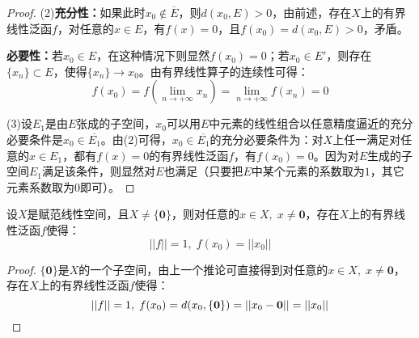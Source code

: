 \begin{proof}
	(2)\textbf{充分性：}如果此时$x_0\notin\overline{E}$，则$d(x_0,E)>0$，由前述，存在$X$上的有界线性泛函$f$，对任意的$x\in E$，有$f(x)=0$，且$f(x_0)=d(x_0,E)>0$，矛盾。\par
	\textbf{必要性：}若$x_0\in E$，在这种情况下则显然$f(x_0)=0$；若$x_0\in E'$，则存在$\{x_n\}\subset E$，使得$\{x_n\}\to x_0$。由有界线性算子的连续性可得：
	\begin{equation*}
		f(x_0)=f\left(\lim_{n\to+\infty}x_n\right)=\lim_{n\to+\infty}f(x_n)=0
	\end{equation*}\par
	(3)设$E_1$是由$E$张成的子空间，$x_0$可以用$E$中元素的线性组合以任意精度逼近的充分必要条件是$x_0\in\overline{E_1}$。由(2)可得，$x_0\in\overline{E_1}$的充分必要条件为：对$X$上任一满足对任意的$x\in E_1$，都有$f(x)=0$的有界线性泛函$f$，有$f(x_0)=0$。因为对$E$生成的子空间$E_1$满足该条件，则显然对$E$也满足（只要把$E$中某个元素的系数取为$1$，其它元素系数取为$0$即可）。
\end{proof}
\begin{corollary}
	设$X$是赋范线性空间，且$X\ne\{\mathbf{0}\}$，则对任意的$x\in X,\;x\ne\mathbf{0}$，存在$X$上的有界线性泛函$f$使得：
	\begin{equation*}
		||f||=1,\;f(x_0)=||x_0||
	\end{equation*}
\end{corollary}
\begin{proof}
	$\{\mathbf{0}\}$是$X$的一个子空间，由上一个推论可直接得到对任意的$x\in X,\;x\ne\mathbf{0}$，存在$X$上的有界线性泛函$f$使得：
	\begin{equation*}
		||f||=1,\;f(x_0)=d(x_0,\{\mathbf{0}\})=||x_0-\mathbf{0}||=||x_0||\qedhere
	\end{equation*}
\end{proof}





